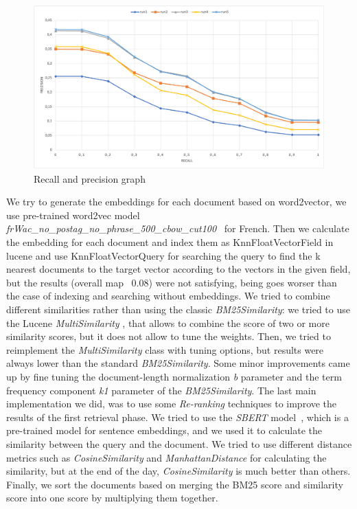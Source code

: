 \begin{figure}[h!]
    \includegraphics[width=\textwidth]{figure/PRgraph.png}
    \caption{Recall and precision graph}
    \label{fig:recallPrecision}
\end{figure}

We try to generate the embeddings for each document based on word2vector, we use pre-trained word2vec model \textit{frWac\_no\_postag\_no\_phrase\_500\_cbow\_cut100}~\cite{fauconnier_2015} for French. Then we calculate the embedding for each document and index them as KnnFloatVectorField in lucene and use KnnFloatVectorQuery for searching the query to find the k nearest documents to the target vector according to the vectors in the given field, but the results (overall map ~0.08) were not satisfying, being  goes worser than the case of indexing and searching without embeddings.
\newline
We tried to combine different similarities rather than using the classic \textit{BM25Similarity}: we tried to use the Lucene \textit{MultiSimilarity} \cite{lucenemultisimilarity}, that allows to combine the score of two or more similarity scores, but it does not allow to
tune the weights. Then, we tried to reimplement the \textit{MultiSimilarity} class with tuning options, but results were always lower than the standard \textit{BM25Similarity}. Some minor improvements came up by fine tuning the document-length
normalization \textit{b} parameter and the term frequency component \textit{k1} parameter of the \textit{BM25Similarity}.
\newline
The last main implementation we did, was to use some \textit{Re-ranking} techniques to improve the results of the first retrieval phase.
We tried to use the \textit{SBERT} model~\cite{reimers-2019-sentence-bert}, which is a pre-trained model for sentence embeddings, and we used it to calculate the similarity between the query and the document.
We tried to use different distance metrics such as \textit{CosineSimilarity} and \textit{ManhattanDistance} for calculating the similarity, but at the end of the day, \textit{CosineSimilarity} is much better than others.
Finally, we sort the documents based on merging the BM25 score and similarity score into one score by multiplying them together.

